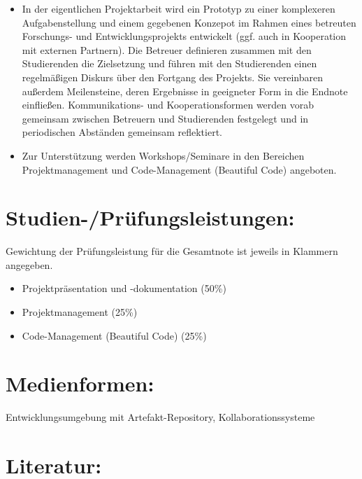 \begin{itemize}
\tightlist
\item
  In der eigentlichen Projektarbeit wird ein Prototyp zu einer
  komplexeren Aufgabenstellung und einem gegebenen Konzepot im Rahmen
  eines betreuten Forschungs- und Entwicklungsprojekts entwickelt (ggf.
  auch in Kooperation mit externen Partnern). Die Betreuer definieren
  zusammen mit den Studierenden die Zielsetzung und führen mit den
  Studierenden einen regelmäßigen Diskurs über den Fortgang des
  Projekts. Sie vereinbaren außerdem Meilensteine, deren Ergebnisse in
  geeigneter Form in die Endnote einfließen. Kommunikations- und
  Kooperationsformen werden vorab gemeinsam zwischen Betreuern und
  Studierenden festgelegt und in periodischen Abständen gemeinsam
  reflektiert.
\item
  Zur Unterstützung werden Workshops/Seminare in den Bereichen
  Projektmanagement und Code-Management (Beautiful Code) angeboten.
\end{itemize}

\section*{Studien-/Prüfungsleistungen:\label{/mi-2017/modulbeschreibungen-master/MA_Modul_Projekt_Entwicklung}}\label{studien-pruxfcfungsleistungenpathlabelmi-2017modulbeschreibungen-mastermaux5fmodulux5fprojektux5fentwicklung}

Gewichtung der Prüfungsleistung für die Gesamtnote ist jeweils in
Klammern angegeben.

\begin{itemize}
\tightlist
\item
  Projektpräsentation und -dokumentation (50\%)
\item
  Projektmanagement (25\%)
\item
  Code-Management (Beautiful Code) (25\%)
\end{itemize}

\section*{Medienformen:\label{/mi-2017/modulbeschreibungen-master/MA_Modul_Projekt_Entwicklung}}\label{medienformenpathlabelmi-2017modulbeschreibungen-mastermaux5fmodulux5fprojektux5fentwicklung}

Entwicklungsumgebung mit Artefakt-Repository, Kollaborationssysteme

\section*{Literatur:\label{/mi-2017/modulbeschreibungen-master/MA_Modul_Projekt_Entwicklung}}\label{literaturpathlabelmi-2017modulbeschreibungen-mastermaux5fmodulux5fprojektux5fentwicklung}

